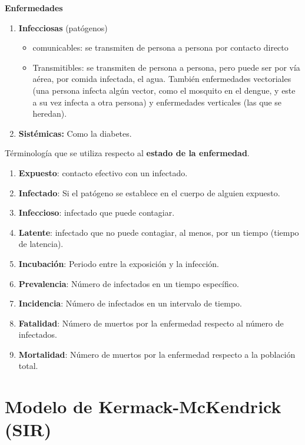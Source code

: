 \documentclass[10pt,oneside]{article}
\theoremstyle{definition}
\begin{document}
\begin{multicols}{2}
    \textbf{Enfermedades}
    
    \begin{enumerate}
        \item \textbf{Infecciosas} (patógenos)
        \begin{itemize}
            \item comunicables: se transmiten de persona a persona por contacto directo 
            \item Transmitibles: se transmiten de persona a persona, pero puede ser por vía aérea, por comida infectada, el agua. También enfermedades vectoriales (una persona infecta algún vector, como el mosquito en el dengue, y este a su vez infecta a otra persona) y enfermedades verticales (las que se heredan). 
        \end{itemize} 
        \item \textbf{Sistémicas:} Como la diabetes.
    \end{enumerate} 
    
    Términología que se utiliza respecto al \textbf{estado de la enfermedad}.
    
    \begin{enumerate}
        \item \textbf{Expuesto}: contacto efectivo con un infectado.
        \item \textbf{Infectado}: Si el patógeno se establece en el cuerpo de alguien expuesto. 
        \item \textbf{Infeccioso}: infectado que puede contagiar.
        \item \textbf{Latente}: infectado que no puede contagiar, al menos, por un tiempo (tiempo de latencia).
        \item \textbf{Incubación}: Periodo entre la exposición y la infección.
        \item \textbf{Prevalencia}: Número de infectados en un tiempo específico.
        \item \textbf{Incidencia}: Número de infectados en un intervalo de tiempo.
        \item \textbf{Fatalidad}: Número de muertos por la enfermedad respecto al número de infectados.
        \item \textbf{Mortalidad}: Número de muertos por la enfermedad respecto a la población total.
    \end{enumerate}

    \section{Modelo de Kermack-McKendrick (SIR)}


\end{multicols}
\end{document}

